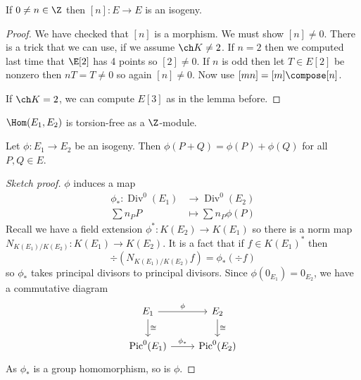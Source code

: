 \documentclass[a4paper]{article}
\theoremstyle{definition}
\DeclareMathOperator{\Div}{Div} %
\DeclareMathOperator{\Pic}{Pic} %
\begin{document}
\begin{lemma}
  If \(0 \neq n \in \Z\) then \([n]: E \to E\) is an isogeny.
\end{lemma}

\begin{proof}
  We have checked that \([n]\) is a morphism. We must show \([n] \neq 0\). There is a trick that we can use, if we assume \(\ch K \neq 2\). If \(n = 2\) then we computed last time that \(\E[2]\) has 4 points so \([2] \neq 0\). If \(n\) is odd then let \(T \in E[2]\) be nonzero then \(nT = T \neq 0\) so again \([n] \neq 0\). Now use \([mn] = [m] \compose [n]\).

  If \(\ch K = 2\), we can compute \(E[3]\) as in the lemma before.
\end{proof}

\begin{corollary}
  \(\Hom(E_1, E_2)\) is torsion-free as a \(\Z\)-module.
\end{corollary}

\begin{lemma}
  Let \(\phi: E_1 \to E_2\) be an isogeny. Then \(\phi(P + Q) = \phi(P) + \phi(Q)\) for all \(P, Q \in E\).
\end{lemma}

\begin{proof}[Sketch proof]
  \(\phi\) induces a map
  \begin{align*}
    \phi_*: \Div^0(E_1) &\to \Div^0(E_2) \\
    \sum n_P P &\mapsto \sum n_P \phi(P)
  \end{align*}
  Recall we have a field extension \(\phi^*: K(E_2) \to K(E_1)\) so there is a norm map \(N_{K(E_1)/K(E_2)}: K(E_1) \to K(E_2)\). It is a fact that if \(f \in K(E_1)^*\) then
  \[
    \div (N_{K(E_1)/K(E_2)} f) = \phi_*(\div f)
  \]
  so \(\phi_*\) takes principal divisors to principal divisors. Since \(\phi(0_{E_1}) = 0_{E_2}\), we have a commutative diagram
  \[
    \begin{tikzcd}
      E_1 \ar[r, "\phi"] \ar[d, "\cong"] & E_2 \ar[d, "\cong"] \\
      \Pic^0(E_1) \ar[r, "\phi_*"] & \Pic^0(E_2)
    \end{tikzcd}
  \]
  As \(\phi_*\) is a group homomorphism, so is \(\phi\).
\end{proof}
\end{document}

